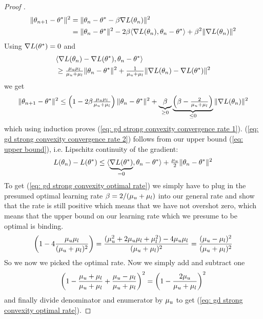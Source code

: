 \begin{proof}[Proof {\parencite[Theorem 2.1.15]{nesterovLecturesConvexOptimization2018}}]
	\begin{align*}
		\|\theta_{n+1} - \theta^*\|^2
		&= \| \theta_n -\theta^* - \beta\nabla L(\theta_n)\|^2\\
		&= \| \theta_n - \theta^*\|^2
		- 2\beta\langle \nabla L(\theta_n), \theta_n - \theta^*\rangle
		+ \beta^2 \| \nabla L(\theta_n)\|^2
	\end{align*}
	Using \(\nabla L(\theta^*)=0\) and 
	\begin{align*}
		&\langle \nabla L(\theta_n) -\nabla L(\theta^*), \theta_n - \theta^*\rangle	\\
		&\ge \tfrac{\mu_u\mu_l}{\mu_u+\mu_l}\|\theta_n - \theta^*\|^2
		+ \tfrac{1}{\mu_u+\mu_l}
		\|\nabla L(\theta_n) - \nabla L(\theta^*)\|^2
	\end{align*}
	we get
	\begin{align*}
		\|\theta_{n+1} - \theta^*\|^2
		\le \left(1- 2\beta \tfrac{\mu_u\mu_l}{\mu_u+\mu_l}\right)
		\|\theta_n - \theta^*\|^2
		+ \underbrace{\beta}_{\ge 0}
		\underbrace{\left(\beta-\tfrac{2}{\mu_u+\mu_l}\right)}_{\le0}
		\|\nabla L(\theta_n)\|^2
	\end{align*}
	which using induction proves (\ref{eq: gd strong convexity convergence rate
	1}). (\ref{eq: gd strong convexity convergence rate 2}) follows from our
	upper bound (\ref{eq: upper bound}), i.e. Lipschitz continuity of the gradient:
	\begin{align*}
		L(\theta_n) - L(\theta^*)
		\le \langle \underbrace{\nabla L(\theta^*)}_{=0}, \theta_n - \theta^*\rangle
		+ \tfrac{\mu_u}{2} \| \theta_n - \theta^*\|^2
	\end{align*}
	To get (\ref{eq: gd strong convexity optimal rate}) we simply have to plug
	in the presumed optimal learning rate \(\beta=2/(\mu_u+\mu_l)\) into
	our general rate and show that the rate is still positive which means that
	we have not overshot zero, which means that the upper bound on our learning
	rate which we presume to be optimal is binding.
	\begin{align*}
		\left(1- 4 \frac{\mu_u\mu_l}{(\mu_u+\mu_l)^2}\right)
		= \frac{(\mu_u^2 + 2\mu_u\mu_l + \mu_l^2) - 4 \mu_u\mu_l}{(\mu_u+\mu_l)^2}
		= \frac{(\mu_u-\mu_l)^2}{(\mu_u+\mu_l)^2}
	\end{align*}
	So we now we picked the optimal rate. Now we simply add and subtract one
	\begin{align*}
		\left(
			1- \frac{\mu_u+\mu_l}{\mu_u+\mu_l}
			+ \frac{\mu_u-\mu_l}{\mu_u+\mu_l}
		\right)^2
		= \left(
			1 - \frac{2\mu_u}{\mu_u+\mu_l}
		\right)^2
	\end{align*}
	and finally divide denominator and enumerator by \(\mu_u\) to get (\ref{eq:
	gd strong convexity optimal rate}).
 \end{proof}


